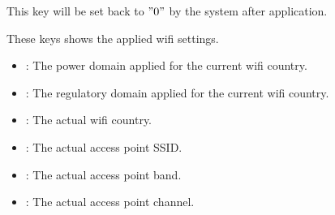 This key will be set back to $"0"$ by the system after application.


These keys shows the applied wifi settings.
\begin{itemize}
\item {} : The power domain applied for the current wifi country.
\item {} : The regulatory domain applied for the current wifi country.
\item {} : The actual wifi country.
\item {} : The actual access point SSID.
\item {} : The actual access point band.
\item {} : The actual access point channel.
\end{itemize}

